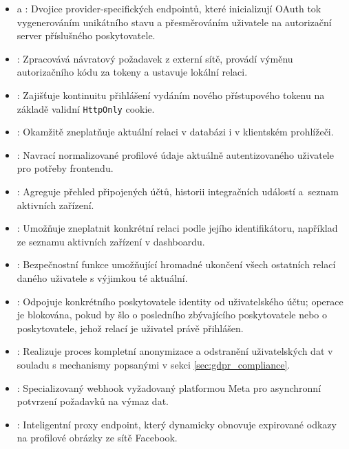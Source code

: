 \documentclass[male,czech,api_bc]{kitheses}
\begin{document}
\begin{itemize}
\item {} a : Dvojice
provider-specifických endpointů, které inicializují OAuth tok vygenerováním
unikátního stavu a přesměrováním uživatele na autorizační server
příslušného poskytovatele.
 
\item {}: Zpracovává návratový požadavek z externí sítě,
provádí výměnu autorizačního kódu za tokeny a ustavuje lokální relaci.
 
\item {}: Zajišťuje kontinuitu přihlášení vydáním nového
přístupového tokenu na základě validní \texttt{HttpOnly} cookie.
 
\item {}: Okamžitě zneplatňuje aktuální relaci v databázi i
v klientském prohlížeči.
 
\item {}: Navrací normalizované profilové údaje aktuálně
autentizovaného uživatele pro potřeby frontendu.
 
\item {}: Agreguje přehled připojených účtů, historii
integračních událostí a~seznam aktivních zařízení.
 
\item {}: Umožňuje zneplatnit
konkrétní relaci podle jejího identifikátoru, například ze seznamu aktivních
zařízení v dashboardu.
 
\item {}: Bezpečnostní funkce umožňující
hromadné ukončení všech ostatních relací daného uživatele s výjimkou té
aktuální.
 
\item {}: Odpojuje konkrétního
poskytovatele identity od uživatelského účtu; operace je blokována, pokud by
šlo o posledního zbývajícího poskytovatele nebo o poskytovatele, jehož
relací je uživatel právě přihlášen.
 
\item {}: Realizuje proces kompletní anonymizace a
odstranění uživatelských dat v souladu s mechanismy popsanými v sekci
\vref{sec:gdpr_compliance}.
 
\item {}: Specializovaný webhook vyžadovaný
platformou Meta pro asynchronní potvrzení požadavků na výmaz dat.
 
\item {}: Inteligentní proxy endpoint, který
dynamicky obnovuje expirované odkazy na profilové obrázky ze sítě Facebook.
\end{itemize}
\end{document}
